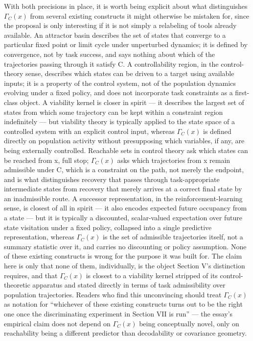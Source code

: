 \documentclass[11pt]{article}
\begin{document}
With both precisions in place, it is worth being explicit about what distinguishes $\Gamma_C(x)$ from several existing constructs it might otherwise be mistaken for, since the proposal is only interesting if it is not simply a relabeling of tools already available. An attractor basin describes the set of states that converge to a particular fixed point or limit cycle under unperturbed dynamics; it is defined by convergence, not by task success, and says nothing about which of the trajectories passing through it satisfy C. A controllability region, in the control-theory sense, describes which states can be driven to a target using available inputs; it is a property of the control system, not of the population dynamics evolving under a fixed policy, and does not incorporate task constraints as a first-class object. A viability kernel is closer in spirit — it describes the largest set of states from which some trajectory can be kept within a constraint region indefinitely — but viability theory is typically applied to the state space of a controlled system with an explicit control input, whereas $\Gamma_C(x)$ is defined directly on population activity without presupposing which variables, if any, are being externally controlled. Reachable sets in control theory ask which states can be reached from x, full stop; $\Gamma_C(x)$ asks which trajectories from x remain admissible under C, which is a constraint on the path, not merely the endpoint, and is what distinguishes recovery that passes through task-appropriate intermediate states from recovery that merely arrives at a correct final state by an inadmissible route. A successor representation, in the reinforcement-learning sense, is closest of all in spirit — it also encodes expected future occupancy from a state — but it is typically a discounted, scalar-valued expectation over future state visitation under a fixed policy, collapsed into a single predictive representation, whereas $\Gamma_C(x)$ is the set of admissible trajectories itself, not a summary statistic over it, and carries no discounting or policy assumption. None of these existing constructs is wrong for the purpose it was built for. The claim here is only that none of them, individually, is the object Section V's distinction requires, and that $\Gamma_C(x)$ is closest to a viability kernel stripped of its control-theoretic apparatus and stated directly in terms of task admissibility over population trajectories. Readers who find this unconvincing should treat $\Gamma_C(x)$ as notation for ``whichever of these existing constructs turns out to be the right one once the discriminating experiment in Section VII is run'' — the essay's empirical claim does not depend on $\Gamma_C(x)$ being conceptually novel, only on reachability being a different predictor than decodability or covariance geometry.
\end{document}
